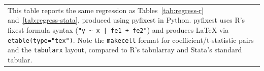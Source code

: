 \documentclass[english,authoryear,IEEEtran,12pt]{article}
\begin{document}
\begin{table}[htbp]
{\vspace{-1.5\baselineskip}
\singlespace
\flushleft
\begin{tabular}{@{}p{\linewidth}@{}}
\footnotesize
This table reports the same regression as Tables~\ref{tab:regress-r} and~\ref{tab:regress-stata}, produced using pyfixest in Python. pyfixest uses R's fixest formula syntax (\texttt{"y \textasciitilde\ x | fe1 + fe2"}) and produces LaTeX via \texttt{etable(type="tex")}. Note the \texttt{makecell} format for coefficient/t-statistic pairs and the \texttt{tabularx} layout, compared to R's tabularray and Stata's standard tabular.
\end{tabular}
}
\end{table}


\clearpage\newpage

\end{document}
